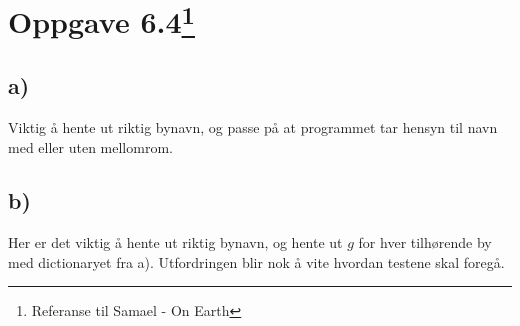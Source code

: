 \documentclass[10pt,a4paper]{article}
\begin{document}
\section*{Oppgave 6.4\footnote{Referanse til Samael - On Earth}}
\subsection*{a)}
Viktig å hente ut riktig bynavn, og passe på at programmet tar hensyn til navn med eller uten mellomrom. 
\subsection*{b)}
Her er det viktig å hente ut riktig bynavn, og hente ut $g$ for hver tilhørende by med dictionaryet fra a). Utfordringen blir nok å vite hvordan testene skal foregå. 

\end{document}
